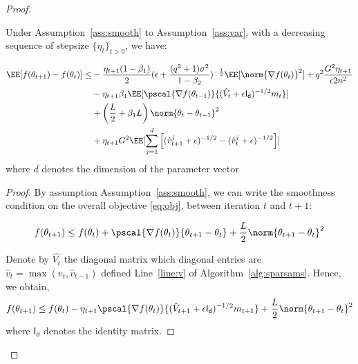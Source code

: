 \documentclass[11pt]{article}
\begin{document}
\begin{proof}
\begin{Lemma}\label{lem:lemma2}
Under Assumption~\ref{ass:smooth} to Assumption~\ref{ass:var}, with a decreasing sequence of stepsize $\{\eta_t\}_{t>0}$, we have:

\begin{equation}
\begin{split}
\EE[f(\theta_{t+1}) - f(\theta_{t}) ] \leq &   - \frac{\eta_{t+1}(1-\beta_1)}{2}  (\epsilon + \frac{(q^2+1)\sigma^2}{1 - \beta_2})^{-\frac{1}{2}} \EE[\norm{\nabla f(\theta_t)}^2] +q^2 \frac{G^2 \eta_{t+1}}{\epsilon 2n^2} \\
&- \eta_{t+1} \beta_1\EE[\pscal{\nabla f(\theta_{t-1})}{(\hat{V}_{t} + \epsilon \mathsf{I_d})^{-1/2} m_{t}}]\\
& +  \left(\frac{L}{2} + \beta_1 L \right) \norm{\theta_t - \theta_{t-1}}^2\\
&+   \eta_{t+1} G^2 \EE[\sum_{j=1}^d \left[(\hat{v}^j_{t+1} + \epsilon )^{-1/2} - (\hat{v}^j_{t} + \epsilon )^{-1/2}  \right] ]
\end{split}
\end{equation}
where $d$ denotes the dimension of the parameter vector
\end{Lemma}



\begin{proof}






By assumption Assumption~\ref{ass:smooth}, we can write the smoothness condition on the overall objective \eqref{eq:obj}, between iteration $t$ and $t+1$:

\begin{equation}
f(\theta_{t+1}) \leq f(\theta_{t})+  \pscal{\nabla f(\theta_t)}{\theta_{t+1} - \theta_{t}} + \frac{L}{2} \norm{\theta_{t+1} - \theta_{t}}^2
\end{equation}

Denote by $\hat{V_t}$ the diagonal matrix which diagonal entries are $\hat v_t=\max(v_t,\hat v_{t-1})$ defined Line~\ref{line:v} of Algorithm~\ref{alg:sparsams}.
Hence, we obtain,
\begin{equation}
f(\theta_{t+1}) \leq f(\theta_{t}) - \eta_{t+1} \pscal{\nabla f(\theta_t)}{(\hat{V}_{t+1} + \epsilon \mathsf{I_d})^{-1/2} m_{t+1}} + \frac{L}{2} \norm{\theta_{t+1} - \theta_{t}}^2
\end{equation}
where $\mathsf{I_d}$ denotes the identity matrix.


\end{proof}
\end{proof}
\end{document}

